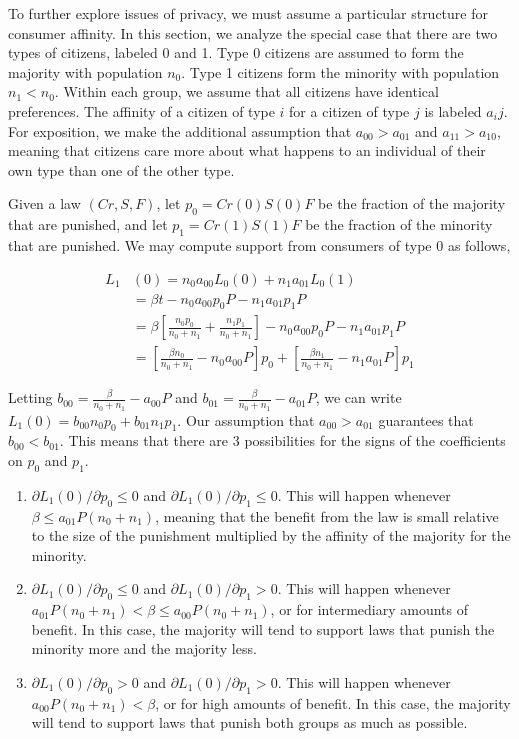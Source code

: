 To further explore issues of privacy, we must assume a particular structure for consumer affinity.  In this section, we analyze the special case that there are two types of citizens, labeled 0 and 1.  Type 0 citizens are assumed to form the majority with population $n_0$.  Type 1 citizens form the minority with population $n_1 < n_0$.  Within each group, we assume that all citizens have identical preferences.  The affinity of a citizen of type $i$ for a citizen of type $j$ is labeled $a_ij$.  For exposition, we make the additional assumption that $a_{00} > a_{01}$ and $a_{11} > a_{10}$, meaning that citizens care more about what happens to an individual of their own type than one of the other type.

Given a law $(Cr, S, F)$, let $p_0 = Cr(0)S(0)F$ be the fraction of the majority that are punished, and let $p_1 = Cr(1)S(1)F$ be the fraction of the minority that are punished.  We may compute support from consumers of type 0 as follows,

\begin{align}
L_1&(0) = n_0 a_{00}  L_0(0) + n_1 a_{01}  L_0(1) \\
&= \beta t - n_0 a_{00}p_0 P - n_1 a_{01}  p_1 P \\
&= \beta \left[ \frac{n_0 p_0}{n_0 + n_1}   + \frac{n_1 p_1}{n_0 + n_1} \right]  - n_0 a_{00}p_0 P - n_1 a_{01}  p_1 P \\
&= \left[  \frac{\beta n_0}{n_0 + n_1} - n_0 a_{00}P  \right]p_0 + \left[ \frac{\beta n_1}{n_0 + n_1} -  n_1 a_{01}P \right] p_1
\end{align}

Letting $b_{00} = \frac{\beta }{n_0 + n_1} -  a_{00}P $ and $b_{01} = \frac{\beta}{n_0 + n_1} -   a_{01}P  $, we can write $L_1(0) = b_{00}n_0p_0 + b_{01} n_1p_1$.  Our assumption that $a_{00} > a_{01}$ guarantees that $b_{00} < b_{01}$.  This means that there are 3 possibilities for the signs of the coefficients on $p_0$ and $p_1$.

\begin{enumerate}
\item $\partial L_1(0) / \partial p_0 \leq 0$ and $\partial L_1(0) / \partial p_1 \leq 0$.  This will happen whenever $\beta \leq   a_{01}P(n_0 + n_1)  $, meaning that the benefit from the law is small relative to the size of the punishment multiplied by the affinity of the majority for the minority.
\item $\partial L_1(0) / \partial p_0 \leq 0$ and $\partial L_1(0) / \partial p_1 > 0$.  This will happen whenever $  a_{01}P(n_0 + n_1) < \beta  \leq a_{00}P(n_0 + n_1) $, or for intermediary amounts of benefit.  In this case, the majority will tend to support laws that punish the minority more and the majority less.
\item $\partial L_1(0) / \partial p_0 > 0$ and $\partial L_1(0) / \partial p_1 > 0$.  This will happen whenever $   a_{00}P(n_0 + n_1) < \beta$, or for high amounts of benefit.  In this case, the majority will tend to support laws that punish both groups as much as possible.
\end{enumerate}

